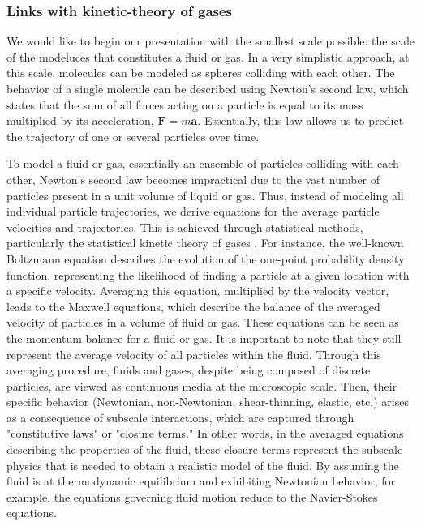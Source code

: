 \subsubsection{Links with kinetic-theory of gases}

We would like to begin our presentation with the smallest scale possible: the scale of the modeluces that constitutes a fluid or gas.
In a very simplistic approach, at this scale, molecules can be modeled as spheres colliding with each other. 
The behavior of a single molecule can be described using Newton's second law, which states that the sum of all forces acting on a particle is equal to its mass multiplied by its acceleration, $\textbf{F} = m \textbf{a}$. 
Essentially, this law allows us to predict the trajectory of one or several particles over time. 


To model a fluid or gas, essentially an ensemble of particles colliding with each other, Newton's second law becomes impractical due to the vast number of particles present in a unit volume of liquid or gas.
Thus, instead of modeling all individual particle trajectories, we derive equations for the average particle velocities and trajectories.
This is achieved through statistical methods, particularly the statistical kinetic theory of gases \cite{hansen2013theory,kardar2007statistical}.
For instance, the well-known Boltzmann equation describes the evolution of the one-point probability density function, representing the likelihood of finding a particle at a given location with a specific velocity.
Averaging this equation, multiplied by the velocity vector, leads to the Maxwell equations, which describe the balance of the averaged velocity of particles in a volume of fluid or gas.
These equations can be seen as the momentum balance for a fluid or gas.
It is important to note that they still represent the average velocity of all particles within the fluid.
Through this averaging procedure, fluids and gases, despite being composed of discrete particles, are viewed as continuous media at the microscopic scale.
Then, their specific behavior (Newtonian, non-Newtonian, shear-thinning, elastic, etc.) arises as a consequence of subscale interactions, which are captured through "constitutive laws" or "closure terms."
In other words, in the averaged equations describing the properties of the fluid, these closure terms represent the subscale physics that is needed to obtain a realistic model of the fluid.
By assuming the fluid is at thermodynamic equilibrium and exhibiting Newtonian behavior, for example, the equations governing fluid motion reduce to the Navier-Stokes equations. 

